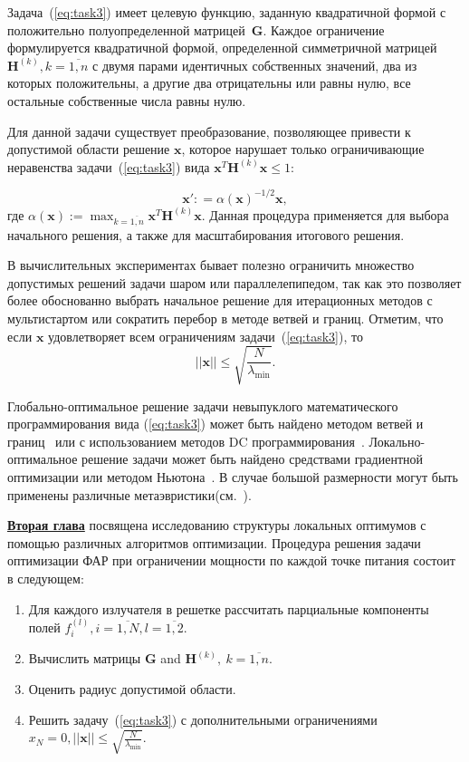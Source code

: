 Задача~(\ref{eq:task3}) имеет целевую функцию, заданную квадратичной формой с положительно полуопределенной матрицей~$\textbf{G}$. Каждое ограничение формулируется квадратичной формой, определенной симметричной матрицей~$\textbf{H}^{(k)}, k=\overline{1,n}$ с двумя парами идентичных собственных значений, два из которых положительны, а другие два отрицательны или равны нулю, все остальные собственные числа равны нулю.

Для данной задачи существует преобразование, позволяющее привести к допустимой области решение $\textbf{x}$, которое нарушает только ограничивающие неравенства задачи~(\ref{eq:task3}) вида $\textbf{x}^{T}\textbf{H}^{(k)}\textbf{x} \leq 1$:

\begin{equation}
    \textbf{x}': =\alpha(\textbf{x})^{-1/2} \textbf{x} ,
    \label{eq:scale}
\end{equation}
где $\alpha(\textbf{x}):=\max_{k=\overline{1,n}} \textbf{x}^T \textbf{H}^{(k)}\textbf{x}$. Данная процедура применяется для выбора начального решения, а также для масштабирования итогового решения.

В вычислительных экспериментах бывает полезно ограничить множество допустимых решений задачи шаром или параллелепипедом, так как это позволяет более обоснованно выбрать начальное решение для итерационных методов с мультистартом или сократить перебор в методе ветвей и границ. Отметим, что если $\textbf{x}$ удовлетворяет всем ограничениям задачи~(\ref{eq:task3}), то
\begin{equation} \label{eqn:bound}
||\textbf{x}||\le \sqrt{\frac{N}{\lambda_{\min}}}.
\end{equation}

Глобально-оптимальное решение задачи невыпуклого математического программирования вида (\ref{eq:task3}) может быть найдено методом
ветвей и границ~\cite{horst:global,tawarmalani:global} или с использованием методов DC программирования~\cite{horst:handbook,strekalovsky:global}. Локально-оптимальное решение задачи может быть найдено средствами градиентной оптимизации или методом Ньютона~\cite{himmelblau:nlp}. В случае большой размерности могут быть применены различные метаэвристики(см.~\cite{eberhart:swarm,storn:de}).

\underline{\textbf{Вторая глава}} посвящена исследованию структуры локальных оптимумов с помощью различных алгоритмов оптимизации.
Процедура решения задачи оптимизации ФАР при ограничении мощности по каждой точке питания состоит в следующем:
%
\begin{enumerate}
  \item Для каждого излучателя в решетке рассчитать парциальные компоненты полей $f_i^{(l)}, i= \overline{1,N}, l=\overline{1,2}$.
  \item Вычислить матрицы $\textbf{G}$ and ${\textbf{H}}^{(k)},\ k=\overline{1,n}$.
  \item Оценить радиус допустимой области.
  \item Решить задачу~(\ref{eq:task3}) с дополнительными ограничениями $x_N = 0, ||\textbf{x}||\le \sqrt{\frac{N}{\lambda_{\min}}}$.
\end{enumerate}

